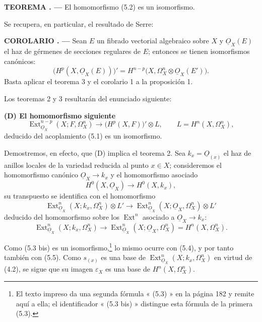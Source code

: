 \documentclass[11pt,twoside,openany]{book}
\numberwithin{equation}{section}
\newcommand{\src}[1]{%
  \phantomsection\hypertarget{src:#1}{}%
  \marginpar{\raggedleft\footnotesize\sffamily #1}%
}
\newcommand{\Osh}{\underline{O}}
\theoremstyle{plain}
\theoremstyle{definition}
\theoremstyle{remark}
\newcommand{\result}[2]{%
  \par\medskip\noindent\textbf{#1%
  \if\relax\detokenize{#2}\relax\else\space#2\fi. ---}\enspace
}
\newcommand{\FgaUnitKey}{frontmatter}
\renewcommand{\src}[1]{%
  \phantomsection\hypertarget{src:\FgaUnitKey:#1}{}%
  \marginpar{\raggedleft\footnotesize\sffamily #1}%
}
\theoremstyle{plain}
\theoremstyle{definition}
\theoremstyle{remark}
\begin{document}
\result{TEOREMA}{3} El homomorfismo (5.2) es un isomorfismo.

Se recupera, en particular, el resultado de Serre:

\result{COROLARIO}{} Sean $E$ un fibrado vectorial algebraico sobre $X$ y
$\Osh_X(E)$ el haz de gérmenes de secciones regulares de $E$; entonces se tienen
isomorfismos canónicos:
\begin{equation}\tag{5.3}
  \bigl(H^{p}(X,\Osh_X(E))\bigr)'
  =H^{n-p}\bigl(X,\Omega_X^{n}\otimes\Osh_X(E')\bigr).
\end{equation}
Basta aplicar el teorema 3 y el corolario 1 a la proposición 1.

Los teoremas 2 y 3 resultarán del enunciado siguiente:

\noindent\textbf{(D) El homomorfismo siguiente}
\begin{equation}\tag{5.2 bis}
  \operatorname{Ext}_{\Osh_X}^{n-p}(X;F,\Omega_X^{n})
  \longrightarrow\bigl(H^{p}(X,F)\bigr)'\otimes L,
  \qquad L=H^{n}(X,\Omega_X^{n}),
\end{equation}
deducido del acoplamiento (5.1) es un isomorfismo.

Demostremos, en efecto, que (D) implica el teorema 2. Sea
$k_x=\Osh_{(x)}$ el haz de anillos locales de la variedad reducida al punto
$x\in X$; consideremos el homomorfismo canónico
$\Osh_X\longrightarrow k_x$ y el homomorfismo asociado
\begin{equation}\tag{5.3 bis}
  H^{0}(X,\Osh_X)\longrightarrow H^{0}(X,k_x),
\end{equation}
su transpuesto se identifica con el homomorfismo
\begin{equation}\tag{5.4}
  \operatorname{Ext}_{\Osh_X}^{n}(X;k_x,\Omega_X^{n})\otimes L'
  \longrightarrow
  \operatorname{Ext}_{\Osh_X}^{n}(X;\Osh_X,\Omega_X^{n})\otimes L'
\end{equation}
deducido del homomorfismo sobre los $\operatorname{Ext}^{n}$ asociado a
$\Osh_X\longrightarrow k_x$:
\begin{equation}\tag{5.5}
  \operatorname{Ext}_{\Osh_X}^{n}(X;k_x,\Omega_X^{n})
  \longrightarrow
  \operatorname{Ext}_{\Osh_X}^{n}(X;\Osh_X,\Omega_X^{n})
  =H^{n}(X,\Omega_X^{n}).
\end{equation}

\src{183}
Como (5.3 bis) es un isomorfismo,\footnote{El texto impreso da una
segunda fórmula « (5.3) » en la página 182 y remite aquí a ella; el identificador
« (5.3 bis) » distingue esta fórmula de la primera (5.3).} lo mismo ocurre
con (5.4), y por tanto también con (5.5). Como $s_{(x)}$ es una base de
$\operatorname{Ext}_{\Osh_X}^{n}(X;k_x,\Omega_X^{n})$ en virtud de (4.2), se
sigue que su imagen $\varepsilon_X$ es una base de
$H^{n}(X,\Omega_X^{n})$.
\end{document}
